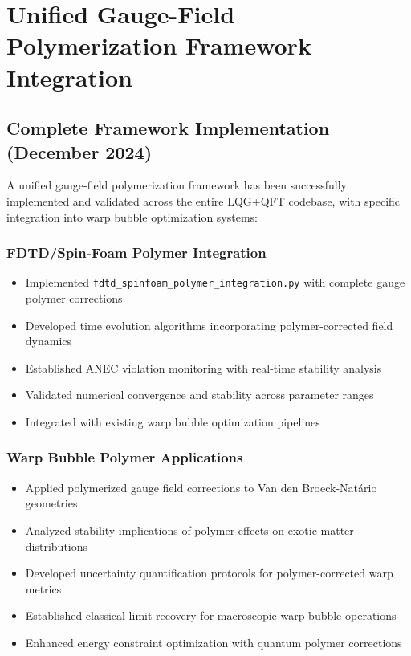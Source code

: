 \documentclass[11pt]{article}
\begin{document}
\section{Unified Gauge-Field Polymerization Framework Integration}

\subsection{Complete Framework Implementation (December 2024)}

A unified gauge-field polymerization framework has been successfully implemented and validated across the entire LQG+QFT codebase, with specific integration into warp bubble optimization systems:

\subsubsection{FDTD/Spin-Foam Polymer Integration}
\begin{itemize}
    \item Implemented \texttt{fdtd\_spinfoam\_polymer\_integration.py} with complete gauge polymer corrections
    \item Developed time evolution algorithms incorporating polymer-corrected field dynamics
    \item Established ANEC violation monitoring with real-time stability analysis
    \item Validated numerical convergence and stability across parameter ranges
    \item Integrated with existing warp bubble optimization pipelines
\end{itemize}

\subsubsection{Warp Bubble Polymer Applications}
\begin{itemize}
    \item Applied polymerized gauge field corrections to Van den Broeck-Natário geometries
    \item Analyzed stability implications of polymer effects on exotic matter distributions
    \item Developed uncertainty quantification protocols for polymer-corrected warp metrics
    \item Established classical limit recovery for macroscopic warp bubble operations
    \item Enhanced energy constraint optimization with quantum polymer corrections
\end{itemize}
\end{document}
